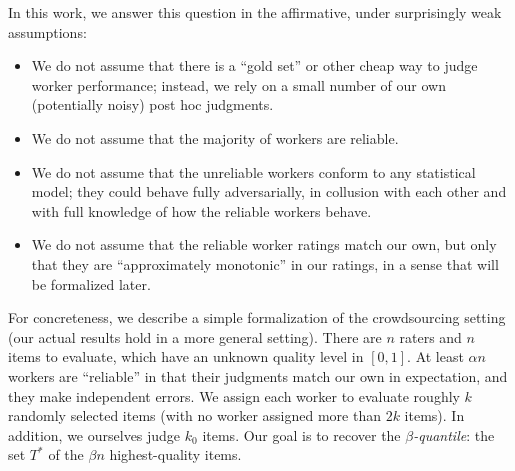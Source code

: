 \iffalse

In this work, we take a different perspective: we make no restrictions on the content that people can produce, and instead focus on \emph{evaluating} this 
content, using human ratings to achieve scalability in this evaluation task. 
For instance, in a crowdsourcing setting where we wanted to translate paragraphs 
from Chinese to English, we would first ask workers to perform the translation, 
and then ask a (potentially) new set of workers to evaluate the quality of 
the translations.   

This leads to several challenges. First, many workers may be unreliable; 
second, some reliable raters might be harsher or more lenient than others; 
third, some translations may be harder to evaluate than others 
and so rater error rates could vary from item to item; 
finally, some workers may even collude. %
Despite these difficulties, though, at least some workers 
actually are reliable. This raises the question: can we obtain 
information from the reliable workers, without knowing who they are a priori?
\fi

In this work, we answer this question in the affirmative, under surprisingly 
weak assumptions:
\begin{itemize}[itemsep=2pt,topsep=0pt,parsep=0pt,partopsep=0pt,leftmargin=30pt]
\item We do not assume that there is a ``gold set'' or other cheap way to judge 
      worker performance; instead, we rely on a small number of our own (potentially noisy) post hoc judgments. 
\item We do not assume that the majority of workers are reliable.
\item We do not assume that the unreliable workers conform to any statistical 
      model; they could behave fully adversarially, in collusion with each other 
      and with full knowledge of how the reliable workers behave.
\item We do not assume that the reliable worker ratings match our own, but only that they are 
      ``approximately monotonic'' in our ratings, in a sense that will be 
      formalized later.
\end{itemize}
For concreteness, we describe a simple formalization of the crowdsourcing 
setting (our actual results hold in a more general setting). 
There are $n$ raters and $n$ items to evaluate, which have an unknown 
quality level in $[0,1]$. At least $\alpha n$ workers are ``reliable'' in that 
their judgments match our own in expectation, and they make independent errors.
We assign each worker to evaluate roughly $k$ randomly selected items (with no worker assigned more than $2k$ items). In addition, we ourselves judge $k_0$ items. Our goal is to 
recover the \emph{$\beta$-quantile}: the set $T^*$ of the $\beta n$ highest-quality items. 

